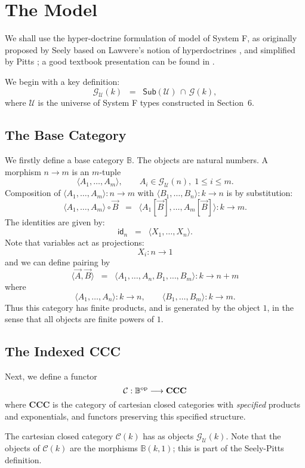 \documentclass[a4paper,11pt]{article}
\newcommand{\UU}{\mathcal{U}}
\newcommand{\GG}[1]{\mathcal{G}(#1)}
\newcommand{\ident}{\mathsf{id}}
\newcommand{\ICC}{\mathcal{C}}
\newcommand{\CCC}{\mathbf{CCC}}
\newcommand{\GU}[1]{\mathcal{G}_{\UU}(#1)}
\newcommand{\SubU}{\mathsf{Sub}(\UU )}
\newcommand{\Base}{\mathbb{B}}
\begin{document}
\section{The Model}

We shall use the hyper-doctrine formulation of model of System F, as
originally proposed by Seely \cite{See87} based on Lawvere's notion
of hyperdoctrines \cite{Law70}, and simplified by Pitts \cite{Pit88};
a good textbook presentation can be found in \cite{Cro93}.

We begin with a key definition:
\[ \GU{k} \;\; = \;\; \SubU \, \cap \, \GG{k} , \]
where $\UU$ is the universe of System F types constructed in Section~6.

\subsection{The Base Category}
We firstly define a base category $\Base$. The objects are natural
numbers. A morphism $n \longrightarrow m$ is an $m$-tuple
\[ \langle A_1 , \ldots , A_m \rangle , \qquad A_i \in \GU{n}, \; 1
\leq i \leq m . \] Composition of $\langle A_1 , \ldots , A_m
\rangle : n \longrightarrow m$ with $\langle B_1 , \ldots , B_n
\rangle : k \longrightarrow n$ is by substitution:
\[ \langle A_1 , \ldots , A_m \rangle \circ \vec{B} \;\; = \;\;
\langle A_1 [\vec{B}], \ldots , A_m [\vec{B}] \rangle : k
\longrightarrow m . \]
The identities are given by:
\[ \ident_{n} \;\; = \;\;  \langle X_1 , \ldots , X_n \rangle . \]
Note that variables act as projections:
\[ X_i : n \longrightarrow 1 \]
and we can define pairing by
\[ \langle \vec{A}, \vec{B} \rangle \;\; = \;\; \langle A_1 , \ldots ,
A_n , B_1 , \ldots , B_m \rangle : k \longrightarrow n+m \]
where
\[ \langle A_1 , \ldots , A_n \rangle : k \longrightarrow n, \qquad \langle B_1 , \ldots , B_m \rangle : k \longrightarrow
m . \]
Thus this category has finite products, and is generated by the object
$1$, in the sense that all objects are finite powers of $1$.


\subsection{The Indexed CCC}
Next, we define a functor
\[ \ICC : \Base^{\mbox{{\scriptsize op}}} \longrightarrow \CCC \]
where $\CCC$ is the category of cartesian closed categories with
\emph{specified} products and exponentials, and functors preserving
this specified structure.

The cartesian closed category $\ICC (k)$ has as objects $\GU{k}$. Note
that the objects of $\ICC (k)$ are the morphisms $\Base (k, 1)$; this
is part of the Seely-Pitts definition.
\end{document}
